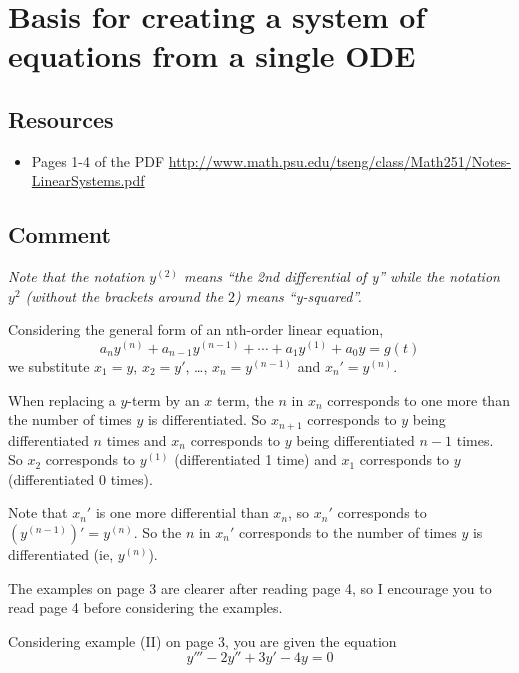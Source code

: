 \newpage
\section{Basis for creating a system of equations from a single ODE}
\label{sec:systembasis}

\subsection*{Resources}
\begin{itemize}
    \item Pages 1-4 of the PDF \url{http://www.math.psu.edu/tseng/class/Math251/Notes-LinearSystems.pdf} 
\end{itemize}

\subsection*{Comment}
\emph{Note that the notation $y^{(2)}$ means ``the 2nd differential of y'' while the notation $y^2$ (without the brackets around the $2$) means ``y-squared''.}

Considering the general form of an nth-order linear equation,
\begin{equation}
    a_n y^{(n)} + a_{n-1} y^{(n-1)} + \cdots + a_1 y^{(1)} + a_0 y = g(t)
\end{equation}
we substitute $x_1=y$, $x_2=y'$, \ldots, $x_n=y^{(n-1)}$ and $x_n'=y^{(n)}$.

When replacing a $y$-term by an $x$ term, the $n$ in $x_n$ corresponds to one more than the number of times $y$ is differentiated. So $x_{n+1}$ corresponds to $y$ being differentiated $n$ times and $x_n$ corresponds to $y$ being differentiated $n-1$ times. So $x_2$ corresponds to $y^{(1)}$ (differentiated 1 time) and $x_1$ corresponds to $y$ (differentiated 0 times).

Note that $x_n'$ is one more differential than $x_n$, so $x_n'$ corresponds to $(y^{(n-1)})' = y^{(n)}$.
So the $n$ in $x_n'$ corresponds to the number of times $y$ is differentiated (ie, $y^{(n)}$).

The examples on page 3 are clearer after reading page 4, so I encourage you to read page 4 before considering the examples.

Considering example (II) on page 3, you are given the equation
\begin{equation}
    y''' - 2y'' + 3y' - 4y = 0
\end{equation}

